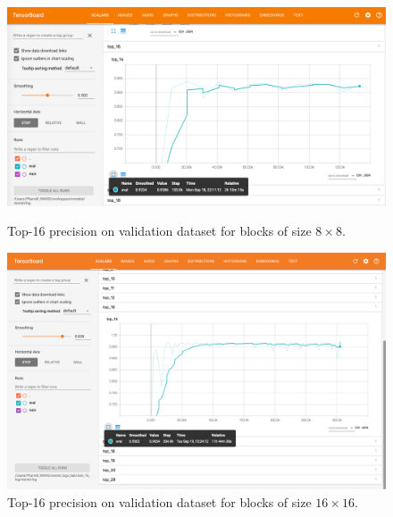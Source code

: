 \begin{figure}
    \begin{minipage}{0.98\textwidth}
    \includegraphics[width=\textwidth,height=\textheight,keepaspectratio]{Figures/blk-8--top-16.png}
    \caption[Top-16 precision on validation dataset for blocks of size \(8\times8\)]{
        Top-16 precision on validation dataset for blocks of size \(8\times8\).
        }\label{fig:top16for8times8}
    \end{minipage}
    
    \vspace*{1cm} %

    \begin{minipage}{0.98\textwidth}
    \includegraphics[width=\textwidth,height=\textheight,keepaspectratio]{Figures/blk16-top16.png}
    \caption[Top-16 precision on validation dataset for blocks of size \(16\times16\)]{
        Top-16 precision on validation dataset for blocks of size \(16\times16\).
        }\label{fig:top16for16times16}
    \end{minipage}
\end{figure}


